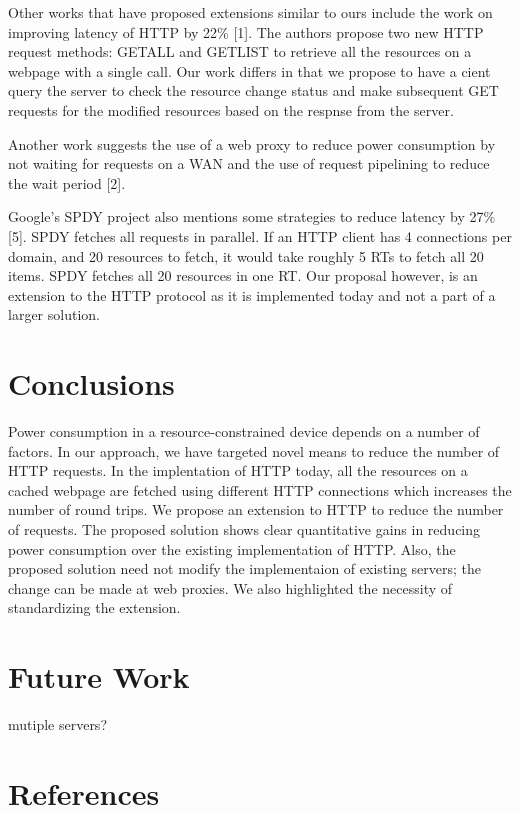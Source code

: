 \documentclass[9pt]{sigplan-proc-varsize}
\begin{document}
Other works that have proposed extensions similar to ours include the work on improving latency of HTTP by 22\% [1]. The authors propose two new HTTP request methods: GETALL and GETLIST to retrieve all the resources on a webpage with a single call. Our work differs in that we propose to have a cient query the server to check the resource change status and make subsequent GET requests for the modified resources based on the respnse from the server.

Another work suggests the use of a web proxy to reduce power consumption by not waiting for requests on a WAN and the use of request pipelining to reduce the wait period [2].

Google's SPDY project also mentions some strategies to reduce latency by 27\%[5]. SPDY fetches all requests in parallel. If an HTTP client has 4 connections per domain, and 20 resources to fetch, it would take roughly 5 RTs to fetch all 20 items. SPDY fetches all 20 resources in one RT. Our proposal however, is an extension to the HTTP protocol as it is implemented today and not a part of a larger solution.

\bigskip

\section{Conclusions}

Power consumption in a resource-constrained device depends on a number of factors. In our approach, we have targeted novel means to reduce the number of HTTP requests. In the implentation of HTTP today, all the resources on a cached webpage are fetched using different HTTP connections which increases the number of round trips. We propose an extension to HTTP to reduce the number of requests. The proposed solution shows clear quantitative gains in reducing power consumption over the existing implementation of HTTP. Also, the proposed solution need not modify the implementaion of existing servers; the change can be made at web proxies. We also highlighted the necessity of standardizing the extension.

\bigskip

\section{Future Work}

mutiple servers?

\bigskip

\section{References}
\end{document}

